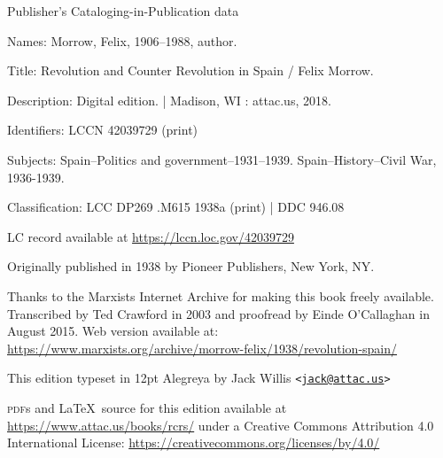 {
	\setlength{\parindent}{0em}
	\setlength{\parskip}{0.5em}
	\sloppy
	
	\vspace*{\fill}
	
	Publisher’s Cataloging-in-Publication data
	
	\vspace{0.5em}
	
	{\setlength{\parskip}{0em}
		Names: Morrow, Felix, 1906--1988, author.
		
		Title: Revolution and Counter Revolution in Spain / Felix Morrow.
		
		Description: Digital edition. | Madison, WI : 
		attac.us, 2018.
		
		Identifiers: LCCN 42039729 (print)
		
		\hangindent=0.7cm
		Subjects: Spain--Politics and government--1931--1939. Spain--History--Civil War, 1936-1939.
		
		Classification: LCC DP269 .M615 1938a (print) | DDC 946.08
		
		LC record available at \url{https://lccn.loc.gov/42039729}
	}
	
	\vspace*{\fill}
	
	Originally published in 1938 by Pioneer Publishers, New York, NY.
	
	Thanks to the Marxists Internet Archive
	for making this book freely available.
	Transcribed by Ted Crawford in 2003
	and proofread by Einde O’Callaghan in August 2015.
	Web version available at:
	\url{https://www.marxists.org/archive/morrow-felix/1938/revolution-spain/}
	
	This edition typeset in 12pt Alegreya by Jack Willis
	\texttt{<\href{mailto:jack@attac.us}{jack@attac.us}>}
	
	\textsc{pdf}s and \LaTeX\ source for this edition available at \url{https://www.attac.us/books/rcrs/}
	under a Creative Commons Attribution 4.0 International License:
	\url{https://creativecommons.org/licenses/by/4.0/}
}


\newpage
\thispagestyle{empty}
\ \\

\newpage
\thispagestyle{empty}
\ \\
